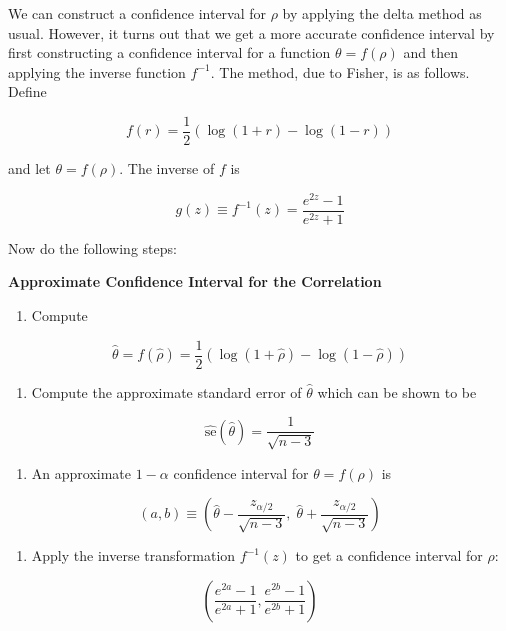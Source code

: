 We can construct a confidence interval for \(\rho\) by applying the
delta method as usual. However, it turns out that we get a more accurate
confidence interval by first constructing a confidence interval for a
function \(\theta = f(\rho)\) and then applying the inverse function
\(f^{-1}\). The method, due to Fisher, is as follows. Define

\[f(r) = \frac{1}{2} \left( \log(1 + r) - \log(1 - r)\right) \]

and let \(\theta = f(\rho)\). The inverse of \(f\) is

\[g(z) \equiv f^{-1}(z) = \frac{e^{2z} - 1}{e^{2z} + 1}\]

Now do the following steps:

\textbf{Approximate Confidence Interval for the Correlation}

\begin{enumerate}[tightlist,label={\arabic*.}]
\item
  Compute
\end{enumerate}

\[\hat{\theta} = f(\hat{\rho}) = \frac{1}{2} \left( \log(1 + \hat{\rho}) - \log(1 - \hat{\rho})\right) \]

\begin{enumerate}[tightlist,label={\arabic*.},resume]
\item
  Compute the approximate standard error of \(\hat{\theta}\) which can
  be shown to be
\end{enumerate}

\[\hat{\text{se}}(\hat{\theta}) = \frac{1}{\sqrt{n - 3}} \]

\begin{enumerate}[tightlist,label={\arabic*.},resume]
\item
  An approximate \(1 - \alpha\) confidence interval for
  \(\theta = f(\rho)\) is
\end{enumerate}

\[(a, b) \equiv \left(\hat{\theta} - \frac{z_{\alpha/2}}{\sqrt{n - 3}}, \; \hat{\theta} + \frac{z_{\alpha/2}}{\sqrt{n - 3}} \right)\]

\begin{enumerate}[tightlist,label={\arabic*.},resume]
\item
  Apply the inverse transformation \(f^{-1}(z)\) to get a confidence
  interval for \(\rho\):
\end{enumerate}

\[ \left( \frac{e^{2a} - 1}{e^{2a} + 1}, \frac{e^{2b} - 1}{e^{2b} + 1} \right) \]

